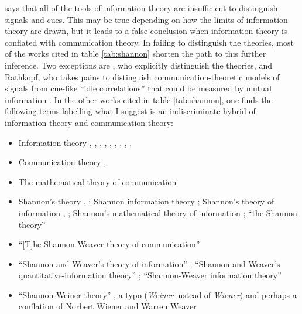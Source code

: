 \documentclass[12pt]{article}
\begin{document}


\ait{} says that all of the tools of information theory are insufficient to distinguish signals and cues.
This may be true depending on how the limits of information theory are drawn, but it leads to a false conclusion when information theory is conflated with communication theory.
In failing to distinguish the theories, most of the works cited in table \ref{tab:shannon} shorten the path to this further inference.
Two exceptions are \citet[17-20]{piccinini2011information}, who explicitly distinguish the theories, and Rathkopf, who takes pains to distinguish communication-theoretic models of signals from cue-like ``idle correlations'' that could be measured by mutual information \citep[p. 324 passim]{rathkopf2017neural}.
In the other works cited in table \ref{tab:shannon}, one finds the following terms labelling what I suggest is an indiscriminate hybrid of information theory and communication theory:

\begin{itemize}
    \item Information theory \citep[p. 3 passim]{adriaans2019information}, \citep[12]{shea2018representation}, \citep[614]{timpson2006grammar}, \citep[2]{baker2021natural}, \citep[3]{kirchhoff2021universal}, \citep[109]{dennett2017bacteria}, \citep[1]{isaac2018semantics}, \citep[8]{godfrey-smith2016biological}, \citep[p. 777 as ``this formal information theory'']{owren2010redefining}, \citep[p. 1991 as ``the theory of information'']{lombardi2015shannon}
    \item Communication theory \citep[592]{timpson2006grammar}, \citep[1987]{lombardi2015shannon}
    \item The mathematical theory of communication \citep[1988]{lombardi2015shannon}
    \item Shannon's theory \citep[2]{isaac2018semantics}, \citep[1984]{lombardi2015shannon}; Shannon information theory \citep[400]{lean2014shannon}; Shannon's theory of information \citep[p. 78, n. 5]{shea2018representation}, \citep[6]{isaac2018semantics}; Shannon's mathematical theory of information \citep[5, 106]{dennett2017bacteria}; ``the Shannon theory'' \citep[p. 599 n. 15]{timpson2006grammar}
    \item ``[T]he Shannon-Weaver theory of communication'' \citep[p. 756 n. 3]{owren2010redefining}
    \item ``Shannon and Weaver's \parencite*{shannon1949mathematical} theory of information'' \citep[759]{owren2010redefining}; ``Shannon and Weaver's quantitative-information theory'' \citep[761]{owren2010redefining}; ``Shannon-Weaver information theory'' \citep[344]{dennett1983intentional}
    \item ``Shannon-Weiner theory'' \citep[19]{baker2021natural}, a typo (\textit{Weiner} instead of \textit{Wiener}) and perhaps a conflation of Norbert Wiener and Warren Weaver
\end{itemize}
\end{document}

